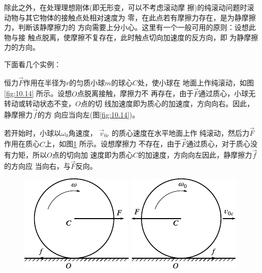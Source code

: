 除此之外，在处理理想刚体(即无形变，可以不考虑滚动摩
擦)的纯滚动问题时滚动物与其它物体的接触点处相对速度为
零，在此点若有摩擦力存在，是为静摩擦力，判断该静摩擦力的
方向需要上分小心。这里有一个一般可用的原则：设想此物与接
触点脱离，使摩擦不复存在，此时触点切向加速度的反方向，即
为静摩擦力的方向。

下面看几个实例：

恒力$\vec{ F }$作用在半径为$ r $的匀质小球$ m $的球心$ C $处，使小球在
地面上作纯滚动，如图\ref{fig:10.14} 所示。设想$ O $点脱离接触，摩擦力不
再存在，由于$\vec{ F }$通过质心，小球无转动或转动状态不变，$ O $点的切
线加速度即为质心的加速度，方向向右。因此，静摩擦力$ \vec{f} $的方
向应当向左(图\ref{fig:10.14})。

若开始时，小球以$ \omega_{ 0 } $角速度， $ \vec{v} _ { 0c } $  的质心速度在水平地面上作
纯滚动，然后力$\vec{F}$作用在质心$ C $上，如图\ref{fig:10.15} 所示。设想摩擦力
不存在，由于$\vec{ F }$通过质心，对于质心没有力矩，所以$ O $点的切向加
速度即为质心$ C $的加速度，方向向左因此，静摩擦力$\vec{f}$的方向应
当向右，与$\vec{F}$反向。

\begin{figure}[h]
    \begin{minipage}{0.5\linewidth}
        \centering
        \includegraphics{figure/fig10.14}
        \caption{}
        \label{fig:10.14}
    \end{minipage}
    \begin{minipage}{0.5\linewidth}
        \centering
        \includegraphics{figure/fig10.15}
        \caption{}
        \label{fig:10.15}
    \end{minipage}
\end{figure}

